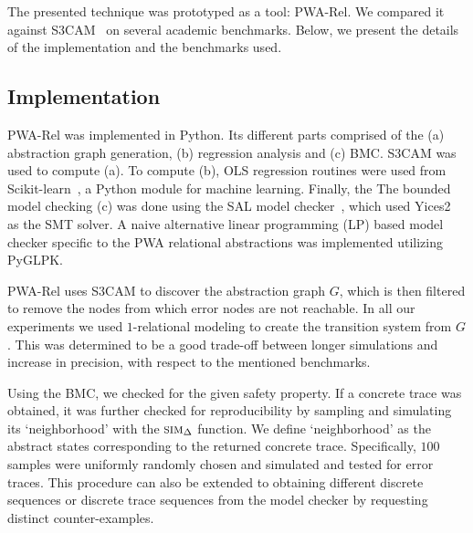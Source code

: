 The presented technique was prototyped as a tool: PWA-Rel.  We
compared it against S3CAM~\cite{zutshi2014multiple} on several
academic benchmarks. Below, we present the details of the
implementation and the benchmarks used.

\subsection{Implementation}
PWA-Rel was implemented in Python. Its different parts comprised of
the (a) abstraction graph generation, (b) regression analysis and (c)
BMC. S3CAM was used to compute (a). To compute (b), OLS regression
routines were used from Scikit-learn~\cite{pedregosa2011scikit}, a
Python module for machine learning. Finally, the The bounded model
checking (c) was done using the SAL model checker~\cite{SAL-SRI},
which used Yices2~\cite{dutertre2014yices} as the SMT solver. A naive
alternative linear programming (LP) based model checker specific to the PWA
relational abstractions was implemented utilizing PyGLPK.

PWA-Rel uses S3CAM to discover the abstraction graph $G$, which is
then filtered to remove the nodes from which error nodes are not
reachable. In all our experiments we used $1$-relational modeling to
create the transition system from $G$. This was determined to be a
good trade-off between longer simulations and increase in precision,
with respect to the mentioned benchmarks.

Using the BMC, we checked for the given safety property. If a concrete
trace was obtained, it was further checked for reproducibility by
sampling and simulating its `neighborhood' with the $\mbox{\sc sim}_\Delta$
function. We define `neighborhood' as the abstract states
corresponding to the returned concrete trace.  Specifically, $100$
samples were uniformly randomly chosen and simulated and tested for
error traces. This procedure can also be extended to obtaining
different discrete sequences or discrete trace sequences from the
model checker by requesting distinct counter-examples.


